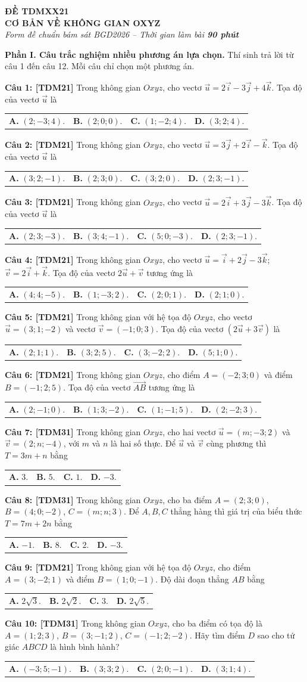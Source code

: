 \documentclass[12pt,a4paper]{article}
\makeatletter
\newcommand{\question}[2][TDM31]{%
  \par\noindent\textbf{\textcolor{sectionpurple}{Câu #2:} \textcolor{noteborder}{[#1]}}\enspace}
\newcommand{\answerlabel}[1]{\textbf{\textcolor{sectionpurple}{#1.}}}
\newcommand{\fourchoices}[4]{%
 \par\nobreak\vspace{1pt}\begin{tabular*}{\linewidth}{@{}l@{\extracolsep{\fill}}lll@{}}
 \answerlabel{A} #1 & \answerlabel{B} #2 & \answerlabel{C} #3 & \answerlabel{D} #4
 \end{tabular*}\par}
\newcommand{\examtitle}[2]{%
 \par\begin{center}\textbf{ĐỀ #1}\\[-1pt]\textbf{#2}\\[-1pt]
 {\fontsize{10.5}{12}\selectfont\itshape Form đề chuẩn bám sát BGD2026 -- Thời gian làm bài \textbf{90 phút}}\end{center}\vspace{-7pt}}
\newcommand{\partone}[1]{\par\textbf{Phần I. Câu trắc nghiệm nhiều phương án lựa chọn.} Thí sinh trả lời từ câu 1 đến câu #1. Mỗi câu chỉ chọn một phương án.\par}
\makeatother
\begin{document}
\fontsize{11.5}{14}\selectfont
\examtitle{TDMXX21}{CƠ BẢN VỀ KHÔNG GIAN OXYZ}
\partone{12}

\question[TDM21]{1} Trong không gian $Oxyz$, cho vectơ $\vec{u}=2\vec{i}-3\vec{j}+4\vec{k}$. Tọa độ của vectơ $\vec{u}$ là
\fourchoices{$(2;-3;4)$.}{$(2;0;0)$.}{$(1;-2;4)$.}{$(3;2;4)$.}

\question[TDM21]{2} Trong không gian $Oxyz$, cho vectơ $\vec{u}=3\vec{j}+2\vec{i}-\vec{k}$. Tọa độ của vectơ $\vec{u}$ là
\fourchoices{$(3;2;-1)$.}{$(2;3;0)$.}{$(3;2;0)$.}{$(2;3;-1)$.}

\question[TDM21]{3} Trong không gian $Oxyz$, cho vectơ $\vec{u}=2\vec{i}+3\vec{j}-3\vec{k}$. Tọa độ của vectơ $\vec{u}$ là
\fourchoices{$(2;3;-3)$.}{$(3;4;-1)$.}{$(5;0;-3)$.}{$(2;3;-1)$.}

\question[TDM21]{4} Trong không gian $Oxyz$, cho vectơ $\vec{u}=\vec{i}+2\vec{j}-3\vec{k}$; $\vec{v}=2\vec{i}+\vec{k}$. Tọa độ của vectơ $2\vec{u}+\vec{v}$ tương ứng là
\fourchoices{$(4;4;-5)$.}{$(1;-3;2)$.}{$(2;0;1)$.}{$(2;1;0)$.}

\question[TDM21]{5} Trong không gian với hệ tọa độ $Oxyz$, cho vectơ $\vec{u}=(3;1;-2)$ và vectơ $\vec{v}=(-1;0;3)$. Tọa độ của vectơ $(2\vec{u}+3\vec{v})$ là
\fourchoices{$(2;1;1)$.}{$(3;2;5)$.}{$(3;-2;2)$.}{$(5;1;0)$.}

\question[TDM21]{6} Trong không gian $Oxyz$, cho điểm $A=(-2;3;0)$ và điểm $B=(-1;2;5)$. Tọa độ của vectơ $\overrightarrow{AB}$ tương ứng là
\fourchoices{$(2;-1;0)$.}{$(1;3;-2)$.}{$(1;-1;5)$.}{$(2;-2;3)$.}

\question[TDM31]{7} Trong không gian $Oxyz$, cho hai vectơ $\vec{u}=(m;-3;2)$ và $\vec{v}=(2;n;-4)$, với $m$ và $n$ là hai số thực. Để $\vec{u}$ và $\vec{v}$ cùng phương thì $T=3m+n$ bằng
\fourchoices{$3$.}{$5$.}{$1$.}{$-3$.}

\question[TDM31]{8} Trong không gian $Oxyz$, cho ba điểm $A=(2;3;0)$, $B=(4;0;-2)$, $C=(m;n;3)$. Để $A,B,C$ thẳng hàng thì giá trị của biểu thức $T=7m+2n$ bằng
\fourchoices{$-1$.}{$8$.}{$2$.}{$-3$.}

\question[TDM21]{9} Trong không gian với hệ tọa độ $Oxyz$, cho điểm $A=(3;-2;1)$ và điểm $B=(1;0;-1)$. Độ dài đoạn thẳng $AB$ bằng
\fourchoices{$2\sqrt{3}$.}{$2\sqrt{2}$.}{$3$.}{$2\sqrt{5}$.}

\question[TDM31]{10} Trong không gian $Oxyz$, cho ba điểm có tọa độ là $A=(1;2;3)$, $B=(3;-1;2)$, $C=(-1;2;-2)$. Hãy tìm điểm $D$ sao cho tứ giác $ABCD$ là hình bình hành?
\fourchoices{$(-3;5;-1)$.}{$(3;3;2)$.}{$(2;0;-1)$.}{$(3;1;4)$.}
\end{document}
